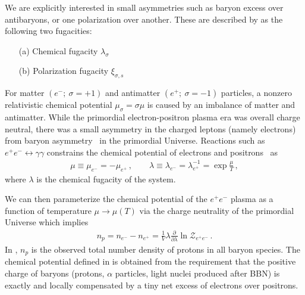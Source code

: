 We are explicitly interested in small asymmetries such as baryon excess over antibaryons, or one polarization over another. These are described by  as the following two fugacities:
\begin{itemize}%
 \item[(a)] Chemical fugacity $\lambda_{\sigma}$
 \item[(b)] Polarization fugacity $\xi_{\sigma,s}$
\end{itemize}
For matter $(e^{-};\ \sigma=+1)$ and antimatter $(e^{+};\ \sigma=-1)$ particles, a nonzero relativistic chemical potential $\mu_{\sigma}=\sigma\mu$ is caused by an imbalance of matter and antimatter. While the primordial electron-positron plasma era was overall charge neutral, there was a small asymmetry in the charged leptons (namely electrons) from baryon asymmetry~\cite{Fromerth:2012fe,Canetti:2012zc} in the primordial Universe. Reactions such as $e^{+}e^{-}\leftrightarrow\gamma\gamma$ constrains the chemical potential of electrons and positrons~\cite{Elze:1980er} as 
\begin{align}
 \label{cpotential}
 \mu\equiv\mu_{e^{-}}=-\mu_{e^{+}}\,,\qquad
 \lambda\equiv\lambda_{e^{-}}=\lambda_{e^{+}}^{-1}=\exp\frac{\mu}{T}\,,
\end{align}
where $\lambda$ is the chemical fugacity of the system.

We can then parameterize the chemical potential of the $e^{+}e^{-}$ plasma as a function of temperature $\mu\rightarrow\mu(T)$ via the charge neutrality of the primordial Universe which implies
\begin{align}
 \label{chargeneutrality}
 n_{p}=n_{e^{-}}-n_{e^{+}}=\frac{1}{V}\lambda\frac{\partial}{\partial\lambda}\ln\mathcal{Z}_{e^{+}e^{-}}\,.
\end{align}
In , $n_{p}$ is the observed total number density of protons in all baryon species. The chemical potential defined in  is obtained from the requirement that the positive charge of baryons (protons, $\alpha$ particles, light nuclei produced after BBN) is exactly and locally compensated by a tiny net excess of electrons over positrons.

